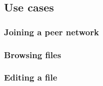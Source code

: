
\subsection{Use cases}

	\subsubsection{Joining a peer network}
	
	\subsubsection{Browsing files}
	
	\subsubsection{Editing a file}
